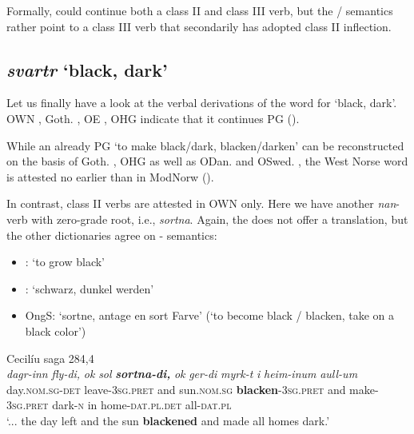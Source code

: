 \documentclass[output=paper,colorlinks,citecolor=brown]{langscibook}
\begin{document}
Formally,  could continue both a class II and class III verb, but the / semantics rather point to a class III verb that secondarily has adopted class II inflection.

\subsection{\textit{svartr} ‘black, dark’}
\label{sec:OWNblack}

Let us finally have a look at the verbal derivations of the word for ‘black, dark’. OWN , Goth. , OE , OHG  indicate that it continues PG  ().

While an already PG   ‘to make black/dark, blacken/darken’ can be reconstructed on the basis of Goth. , OHG  as well as ODan.  and OSwed. , the West Norse word is attested no earlier than in ModNorw  (\citealt[1222]{BjorvandLindeman2019}).

In contrast, class II verbs are attested in OWN only. Here we have another \textit{nan}-verb with zero-grade root, i.e., \textit{sortna}. Again, the  does not offer a translation, but the other dictionaries agree on - semantics:

\begin{itemize}
\item {}: ‘to grow black’
\item {}: ‘schwarz, dunkel werden’
\item OngS: ‘sortne, antage en sort Farve’ (‘to become black / blacken, take on a black color’)
\end{itemize}
 
\begin{exe} 
    \ex Cecilíu saga 284,4 \label{ex:sortna}\\
     \textit{dagr-inn} \textit{fly-di,} \textit{ok} \textit{sol} {\textbf{\textit{sortna-di,}} } \textit{ok} \textit{ger-di} \textit{myrk-t} \textit{i} \textit{heim-inum} \textit{aull-um}\\
     {} day.\textsc{nom.sg-det} leave-\textsc{3sg.pret} and sun.\textsc{nom.sg} \textbf{blacken}-\textsc{3sg.pret} and make-\textsc{3sg.pret} dark-\textsc{n} in home-\textsc{dat.pl.det} all-\textsc{dat.pl}\\
    \glt ‘... the day left and the sun \textbf{blackened} and made all homes dark.’
\end{exe} 
\end{document}
